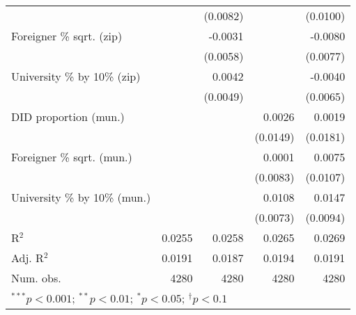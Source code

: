\begin{tabular}{l D{.}{.}{4.6} D{.}{.}{4.7} D{.}{.}{4.7} D{.}{.}{4.7}}
                                  &             & (0.0082)     &              & (0.0100)     \\
Foreigner \% sqrt. (zip)          &             & -0.0031      &              & -0.0080      \\
                                  &             & (0.0058)     &              & (0.0077)     \\
University \% by 10\% (zip)       &             & 0.0042       &              & -0.0040      \\
                                  &             & (0.0049)     &              & (0.0065)     \\
DID proportion (mun.)             &             &              & 0.0026       & 0.0019       \\
                                  &             &              & (0.0149)     & (0.0181)     \\
Foreigner \% sqrt. (mun.)         &             &              & 0.0001       & 0.0075       \\
                                  &             &              & (0.0083)     & (0.0107)     \\
University \% by 10\% (mun.)      &             &              & 0.0108       & 0.0147       \\
                                  &             &              & (0.0073)     & (0.0094)     \\
\midrule
R$^2$                             & 0.0255      & 0.0258       & 0.0265       & 0.0269       \\
Adj. R$^2$                        & 0.0191      & 0.0187       & 0.0194       & 0.0191       \\
Num. obs.                         & 4280        & 4280         & 4280         & 4280         \\
\bottomrule
{}
\end{tabular}
